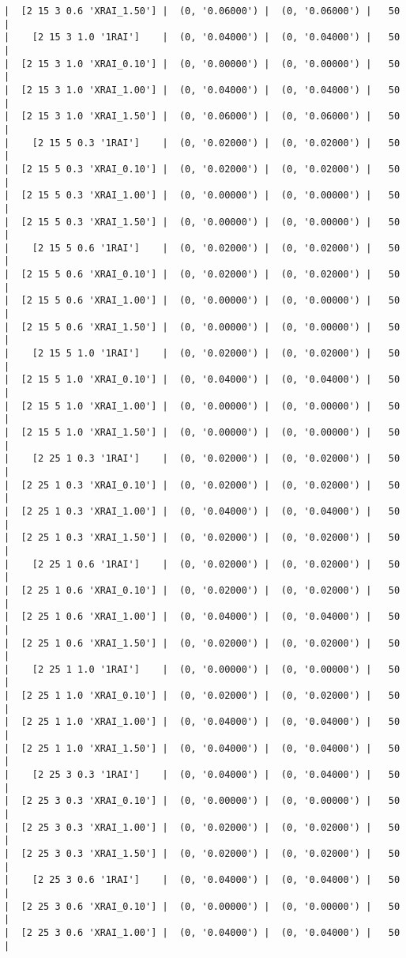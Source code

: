 \documentclass{article}
\begin{document}
\begin{verbatim}
|  [2 15 3 0.6 'XRAI_1.50'] |  (0, '0.06000') |  (0, '0.06000') |   50  |
|    [2 15 3 1.0 '1RAI']    |  (0, '0.04000') |  (0, '0.04000') |   50  |
|  [2 15 3 1.0 'XRAI_0.10'] |  (0, '0.00000') |  (0, '0.00000') |   50  |
|  [2 15 3 1.0 'XRAI_1.00'] |  (0, '0.04000') |  (0, '0.04000') |   50  |
|  [2 15 3 1.0 'XRAI_1.50'] |  (0, '0.06000') |  (0, '0.06000') |   50  |
|    [2 15 5 0.3 '1RAI']    |  (0, '0.02000') |  (0, '0.02000') |   50  |
|  [2 15 5 0.3 'XRAI_0.10'] |  (0, '0.02000') |  (0, '0.02000') |   50  |
|  [2 15 5 0.3 'XRAI_1.00'] |  (0, '0.00000') |  (0, '0.00000') |   50  |
|  [2 15 5 0.3 'XRAI_1.50'] |  (0, '0.00000') |  (0, '0.00000') |   50  |
|    [2 15 5 0.6 '1RAI']    |  (0, '0.02000') |  (0, '0.02000') |   50  |
|  [2 15 5 0.6 'XRAI_0.10'] |  (0, '0.02000') |  (0, '0.02000') |   50  |
|  [2 15 5 0.6 'XRAI_1.00'] |  (0, '0.00000') |  (0, '0.00000') |   50  |
|  [2 15 5 0.6 'XRAI_1.50'] |  (0, '0.00000') |  (0, '0.00000') |   50  |
|    [2 15 5 1.0 '1RAI']    |  (0, '0.02000') |  (0, '0.02000') |   50  |
|  [2 15 5 1.0 'XRAI_0.10'] |  (0, '0.04000') |  (0, '0.04000') |   50  |
|  [2 15 5 1.0 'XRAI_1.00'] |  (0, '0.00000') |  (0, '0.00000') |   50  |
|  [2 15 5 1.0 'XRAI_1.50'] |  (0, '0.00000') |  (0, '0.00000') |   50  |
|    [2 25 1 0.3 '1RAI']    |  (0, '0.02000') |  (0, '0.02000') |   50  |
|  [2 25 1 0.3 'XRAI_0.10'] |  (0, '0.02000') |  (0, '0.02000') |   50  |
|  [2 25 1 0.3 'XRAI_1.00'] |  (0, '0.04000') |  (0, '0.04000') |   50  |
|  [2 25 1 0.3 'XRAI_1.50'] |  (0, '0.02000') |  (0, '0.02000') |   50  |
|    [2 25 1 0.6 '1RAI']    |  (0, '0.02000') |  (0, '0.02000') |   50  |
|  [2 25 1 0.6 'XRAI_0.10'] |  (0, '0.02000') |  (0, '0.02000') |   50  |
|  [2 25 1 0.6 'XRAI_1.00'] |  (0, '0.04000') |  (0, '0.04000') |   50  |
|  [2 25 1 0.6 'XRAI_1.50'] |  (0, '0.02000') |  (0, '0.02000') |   50  |
|    [2 25 1 1.0 '1RAI']    |  (0, '0.00000') |  (0, '0.00000') |   50  |
|  [2 25 1 1.0 'XRAI_0.10'] |  (0, '0.02000') |  (0, '0.02000') |   50  |
|  [2 25 1 1.0 'XRAI_1.00'] |  (0, '0.04000') |  (0, '0.04000') |   50  |
|  [2 25 1 1.0 'XRAI_1.50'] |  (0, '0.04000') |  (0, '0.04000') |   50  |
|    [2 25 3 0.3 '1RAI']    |  (0, '0.04000') |  (0, '0.04000') |   50  |
|  [2 25 3 0.3 'XRAI_0.10'] |  (0, '0.00000') |  (0, '0.00000') |   50  |
|  [2 25 3 0.3 'XRAI_1.00'] |  (0, '0.02000') |  (0, '0.02000') |   50  |
|  [2 25 3 0.3 'XRAI_1.50'] |  (0, '0.02000') |  (0, '0.02000') |   50  |
|    [2 25 3 0.6 '1RAI']    |  (0, '0.04000') |  (0, '0.04000') |   50  |
|  [2 25 3 0.6 'XRAI_0.10'] |  (0, '0.00000') |  (0, '0.00000') |   50  |
|  [2 25 3 0.6 'XRAI_1.00'] |  (0, '0.04000') |  (0, '0.04000') |   50  |

\end{verbatim}
\end{document}
